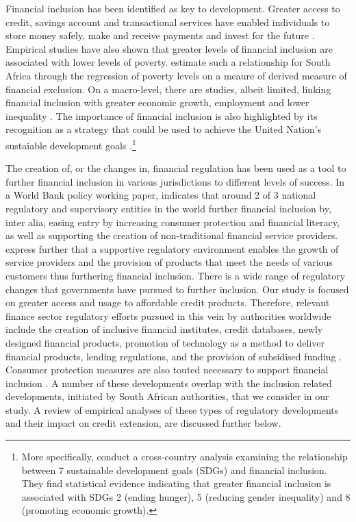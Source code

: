 \documentclass[
  letterpaper,
  DIV=11,
  numbers=noendperiod]{scrartcl}
\begin{document}
Financial inclusion has been identified as key to development. Greater
access to credit, savings account and transactional services have
enabled individuals to store money safely, make and receive payments and
invest for the future \citep{demirgucc2021}. Empirical studies have also
shown that greater levels of financial inclusion are associated with
lower levels of poverty. \citet{mahalika2023} estimate such a
relationship for South Africa through the regression of poverty levels
on a meaure of derived measure of financial exclusion. On a macro-level,
there are studies, albeit limited, linking financial inclusion with
greater economic growth, employment and lower inequality
\citep{demirgucc2017}. The importance of financial inclusion is also
highlighted by its recognition as a strategy that could be used to
achieve the United Nation's sustaiable development goals
\citep{ozili2021}.\footnote{More specifically, \citet{yap2023} conduct a
  cross-country analysis examining the relationship between 7
  sustainable development goals (SDGs) and financial inclusion. They
  find statistical evidence indicating that greater financial inclusion
  is associated with SDGs 2 (ending hunger), 5 (reducing gender
  inequality) and 8 (promoting economic growth).}

The creation of, or the changes in, financial regulation has been used
as a tool to further financial inclusion in various jurisdictions to
different levels of success. In a World Bank policy working paper,
\citet{chen2019} indicates that around 2 of 3 national regulatory and
supervisory entities in the world further financial inclusion by, inter
alia, easing entry by increasing consumer protection and financial
literacy, as well as supporting the creation of non-traditional
financial service providers. \citet{chen2019} express further that a
supportive regulatory environment enables the growth of service
providers and the provision of products that meet the needs of various
customers thus furthering financial inclusion. There is a wide range of
regulatory changes that governments have pursued to further inclusion.
Our study is focused on greater access and usage to affordable credit
products. Therefore, relevant finance sector regulatory efforts pursued
in this vein by authorities worldwide include the creation of inclusive
financial institutes, credit databases, newly designed financial
products, promotion of technology as a method to deliver financial
products, lending regulations, and the provision of subsidised funding
\citep{yoshino2016}. Consumer protection measures are also touted
necessary to support financial inclusion \citep{yoshino2016}. A number
of these developments overlap with the inclusion related developments,
initiated by South African authorities, that we consider in our study. A
review of empirical analyses of these types of regulatory developments
and their impact on credit extension, are discussed further below.
\end{document}

